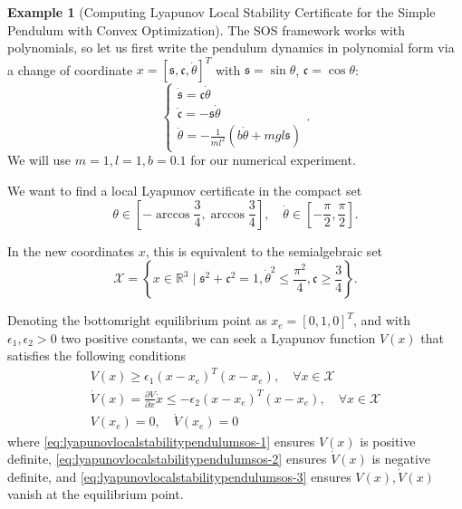 \documentclass[
]{book}
\theoremstyle{definition}
\theoremstyle{definition}
\newtheorem{example}{Example}[chapter]
\theoremstyle{definition}
\theoremstyle{definition}
\theoremstyle{remark}
\begin{document}
\begin{example}[Computing Lyapunov Local Stability Certificate for the Simple Pendulum with Convex Optimization]
\protect\hypertarget{exm:lyapunovlocalstabilitypendulumsos}{}\label{exm:lyapunovlocalstabilitypendulumsos}The SOS framework works with polynomials, so let us first write the pendulum dynamics in polynomial form via a change of coordinate \(x = [\mathfrak{s}, \mathfrak{c}, \dot{\theta}]^T\) with \(\mathfrak{s} = \sin \theta\), \(\mathfrak{c} = \cos\theta\):
\[
\begin{cases}
\dot{\mathfrak{s}} = \mathfrak{c} \dot{\theta} \\
\dot{\mathfrak{c}} = -\mathfrak{s} \dot{\theta} \\
\ddot{\theta} = - \frac{1}{ml^2}(b \dot{\theta} + mgl \mathfrak{s})
\end{cases}.
\]
We will use \(m = 1, l = 1, b=0.1\) for our numerical experiment.

We want to find a local Lyapunov certificate in the compact set
\begin{equation}
\theta \in \left[-\arccos \frac{3}{4}, \arccos \frac{3}{4} \right], \quad \dot{\theta} \in \left[- \frac{\pi}{2}, \frac{\pi}{2} \right].
\label{eq:lyapunovlocalstabilitypendulumsos-constraintset}
\end{equation}

In the new coordinates \(x\), this is equivalent to the semialgebraic set
\[
\mathcal{X} = \left\{ x \in \mathbb{R}^{3} \mid \mathfrak{s}^2 + \mathfrak{c}^2 = 1, \dot{\theta}^2 \leq \frac{\pi^2}{4}, \mathfrak{c} \geq \frac{3}{4}  \right\}.
\]

Denoting the bottomright equilibrium point as \(x_e = [0,1,0]^T\), and with \(\epsilon_1,\epsilon_2 > 0\) two positive constants, we can seek a Lyapunov function \(V(x)\) that satisfies the following conditions
\begin{align}
V(x) \geq \epsilon_1 (x - x_e)^T (x - x_e), \quad \forall x \in \mathcal{X} \label{eq:lyapunovlocalstabilitypendulumsos-1}\\
\dot{V}(x) = \frac{\partial V}{\partial x} \dot{x} \leq - \epsilon_2 (x - x_e)^T (x - x_e), \quad \forall x \in \mathcal{X} \label{eq:lyapunovlocalstabilitypendulumsos-2}\\
V(x_e) = 0, \quad \dot{V}(x_e) = 0 \label{eq:lyapunovlocalstabilitypendulumsos-3}
\end{align}
where \eqref{eq:lyapunovlocalstabilitypendulumsos-1} ensures \(V(x)\) is positive definite, \eqref{eq:lyapunovlocalstabilitypendulumsos-2} ensures \(\dot{V}(x)\) is negative definite, and \eqref{eq:lyapunovlocalstabilitypendulumsos-3} ensures \(V(x),\dot{V}(x)\) vanish at the equilibrium point.


\end{example}
\end{document}
